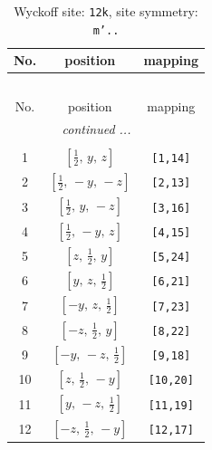 \documentclass[fleqn,8pt]{jsarticle}
\begin{document}
\begin{longtable}{ccc}
\caption{Wyckoff site: {\tt 12k}, site symmetry: {\tt m'..}}
 \\
 \hline \hline
No. & position & mapping \\ \hline \endfirsthead

\multicolumn{2}{l}{\tablename\ \thetable{}} \\
 \hline \hline
No. & position & mapping \\ \hline \endhead

 \hline \hline
\multicolumn{2}{r}{\footnotesize\it continued ...} \\ \endfoot

 \hline \hline
\multicolumn{2}{r}{} \\ \endlastfoot

1 & $\left[ \frac{1}{2},\, y,\, z \right]$ & {\tt [1,14]} \\ \hline
2 & $\left[ \frac{1}{2},\, - y,\, - z \right]$ & {\tt [2,13]} \\ \hline
3 & $\left[ \frac{1}{2},\, y,\, - z \right]$ & {\tt [3,16]} \\ \hline
4 & $\left[ \frac{1}{2},\, - y,\, z \right]$ & {\tt [4,15]} \\ \hline
5 & $\left[ z,\, \frac{1}{2},\, y \right]$ & {\tt [5,24]} \\ \hline
6 & $\left[ y,\, z,\, \frac{1}{2} \right]$ & {\tt [6,21]} \\ \hline
7 & $\left[ - y,\, z,\, \frac{1}{2} \right]$ & {\tt [7,23]} \\ \hline
8 & $\left[ - z,\, \frac{1}{2},\, y \right]$ & {\tt [8,22]} \\ \hline
9 & $\left[ - y,\, - z,\, \frac{1}{2} \right]$ & {\tt [9,18]} \\ \hline
10 & $\left[ z,\, \frac{1}{2},\, - y \right]$ & {\tt [10,20]} \\ \hline
11 & $\left[ y,\, - z,\, \frac{1}{2} \right]$ & {\tt [11,19]} \\ \hline
12 & $\left[ - z,\, \frac{1}{2},\, - y \right]$ & {\tt [12,17]} \\
\end{longtable}
\renewcommand{\arraystretch}{1.2}
\end{document}
